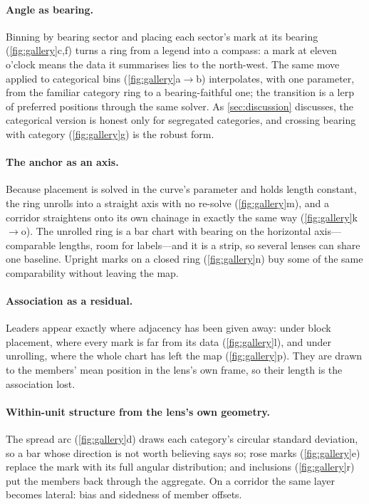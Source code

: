 \paragraph{Angle as bearing.} Binning by bearing sector and placing each
sector's mark at its bearing (\cref{fig:gallery}c,f) turns a ring from a legend
into a compass: a mark at eleven o'clock means the data it summarises lies to
the north-west. The same move applied to categorical bins
(\cref{fig:gallery}a$\to$b) interpolates, with one parameter, from the familiar
category ring to a bearing-faithful one; the transition is a lerp of preferred
positions through the same solver. As \cref{sec:discussion} discusses, the
categorical version is honest only for segregated categories, and crossing
bearing with category (\cref{fig:gallery}g) is the robust form.

\paragraph{The anchor as an axis.} Because placement is solved in the curve's
parameter and holds length constant, the ring unrolls into a straight axis with
no re-solve (\cref{fig:gallery}m), and a corridor straightens onto its own
chainage in exactly the same way (\cref{fig:gallery}k$\to$o). The unrolled ring
is a bar chart with bearing on the horizontal axis---comparable lengths, room
for labels---and it is a strip, so several lenses can share one baseline. Upright
marks on a closed ring (\cref{fig:gallery}n) buy some of the same comparability
without leaving the map.

\paragraph{Association as a residual.} Leaders appear exactly where adjacency
has been given away: under block placement, where every mark is far from its
data (\cref{fig:gallery}l), and under unrolling, where the whole chart has left
the map (\cref{fig:gallery}p). They are drawn to the members' mean position in
the lens's own frame, so their length is the association lost.

\paragraph{Within-unit structure from the lens's own geometry.} The spread arc
(\cref{fig:gallery}d) draws each category's circular standard deviation, so a
bar whose direction is not worth believing says so; rose marks
(\cref{fig:gallery}e) replace the mark with its full angular distribution; and
inclusions (\cref{fig:gallery}r) put the members back through the aggregate. On a
corridor the same layer becomes lateral: bias and sidedness of member offsets.

